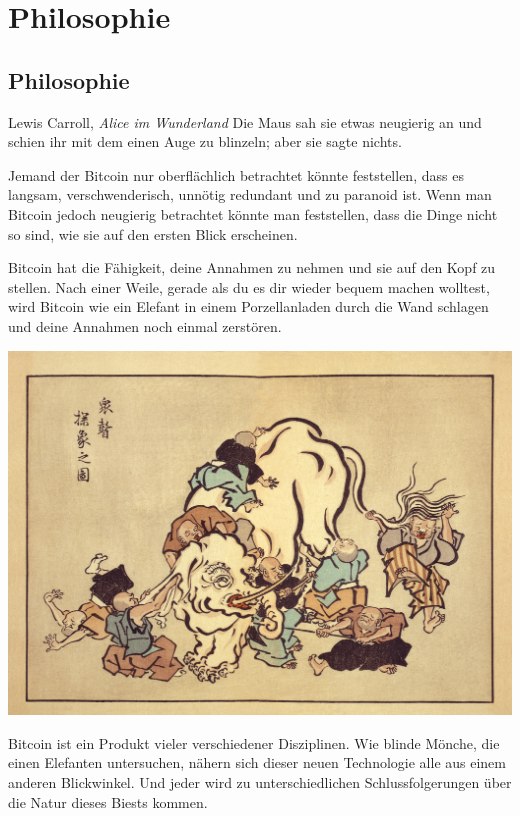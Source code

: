\part{Philosophie}
\label{ch:philosophy}
\chapter*{Philosophie}

\begin{chapquote}{Lewis Carroll, \textit{Alice im Wunderland}}
Die Maus sah sie etwas neugierig an und schien ihr mit dem einen Auge zu
blinzeln; aber sie sagte nichts.
\end{chapquote}

Jemand der Bitcoin nur oberflächlich betrachtet könnte feststellen, dass es
langsam, verschwenderisch, unnötig redundant und zu paranoid ist. Wenn man
Bitcoin jedoch neugierig betrachtet könnte man feststellen, dass die Dinge nicht
so sind, wie sie auf den ersten Blick erscheinen.

Bitcoin hat die Fähigkeit, deine Annahmen zu nehmen und sie auf den Kopf zu
stellen. Nach einer Weile, gerade als du es dir wieder bequem machen wolltest,
wird Bitcoin wie ein Elefant in einem Porzellanladen durch die Wand schlagen und
deine Annahmen noch einmal zerstören.

\begin{center}
  \includegraphics[width=\textwidth]{assets/images/blind-monks.jpg}
  \label{fig:blind-monks}
\end{center}

Bitcoin ist ein Produkt vieler verschiedener Disziplinen. Wie blinde Mönche, die
einen Elefanten untersuchen, nähern sich dieser neuen Technologie alle aus einem
anderen Blickwinkel. Und jeder wird zu unterschiedlichen Schlussfolgerungen über
die Natur dieses Biests kommen.

